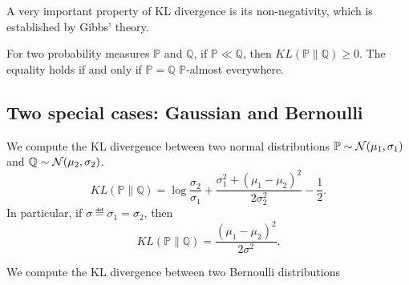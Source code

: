 A very important property of KL divergence is its non-negativity, which is established by Gibbs' theory.

\begin{theorem}\label{thm:maths.gibbs}
\begin{leftbar}[theorembar]
	For two probability measures $\mathbb{P}$ and $\mathbb{Q}$, if $\mathbb{P} \ll \mathbb{Q}$, then $KL(\mathbb{P} \lVert \mathbb{Q}) \geq 0$. The equality holds if and only if $\mathbb{P} = \mathbb{Q}$ $\mathbb{P}$-almost everywhere.
\end{leftbar}
\end{theorem}



\subsection{Two special cases: Gaussian and Bernoulli}\label{app:maths.information.examples}

\begin{example}
\begin{leftbar}[examplebar]
	We compute the KL divergence between two normal distributions $\mathbb{P}\sim\mathcal{N}(\mu_1,\sigma_1)$ and $\mathbb{Q}\sim\mathcal{N}(\mu_2,\sigma_2)$.
	\[
		KL(\mathbb{P} \lVert \mathbb{Q}) = \log \frac{\sigma_2}{\sigma_1} + \frac{\sigma_1^2+(\mu_1-\mu_2)^2}{2\sigma_2^2} - \frac{1}{2}.
	\]
In particular, if $\sigma\eqdef\sigma_1=\sigma_2$, then
	\[
		KL(\mathbb{P} \lVert \mathbb{Q}) = \frac{(\mu_1-\mu_2)^2}{2\sigma^2}.
	\]
\end{leftbar}
\end{example}

\begin{example}
\begin{leftbar}[examplebar]
    We compute the KL divergence between two Bernoulli distributions
\end{leftbar}
\end{example}
